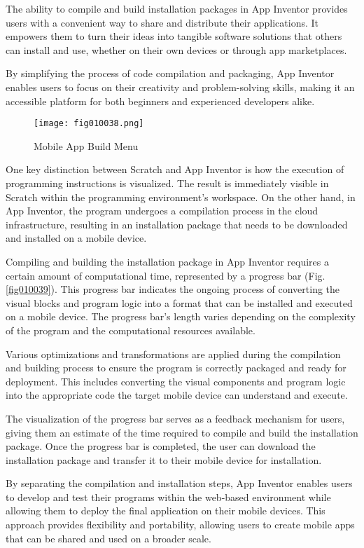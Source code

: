 The ability to compile and build installation packages in App Inventor provides users with a convenient way to share and distribute their applications. It empowers them to turn their ideas into tangible software solutions that others can install and use, whether on their own devices or through app marketplaces.

By simplifying the process of code compilation and packaging, App Inventor enables users to focus on their creativity and problem-solving skills, making it an accessible platform for both beginners and experienced developers alike.

\begin{figure}[H]
   \centering
   \texttt{[image: fig010038.png]}
   \caption{Mobile App Build Menu}
\label{fig010038}
\end{figure}

One key distinction between Scratch and App Inventor is how the execution of programming instructions is visualized. The result is immediately visible in Scratch within the programming environment's workspace. On the other hand, in App Inventor, the program undergoes a compilation process in the cloud infrastructure, resulting in an installation package that needs to be downloaded and installed on a mobile device. 

Compiling and building the installation package in App Inventor requires a certain amount of computational time, represented by a progress bar (Fig. \ref{fig010039}). This progress bar indicates the ongoing process of converting the visual blocks and program logic into a format that can be installed and executed on a mobile device. The progress bar's length varies depending on the complexity of the program and the computational resources available.

Various optimizations and transformations are applied during the compilation and building process to ensure the program is correctly packaged and ready for deployment. This includes converting the visual components and program logic into the appropriate code the target mobile device can understand and execute.

The visualization of the progress bar serves as a feedback mechanism for users, giving them an estimate of the time required to compile and build the installation package. Once the progress bar is completed, the user can download the installation package and transfer it to their mobile device for installation.

By separating the compilation and installation steps, App Inventor enables users to develop and test their programs within the web-based environment while allowing them to deploy the final application on their mobile devices. This approach provides flexibility and portability, allowing users to create mobile apps that can be shared and used on a broader scale.

